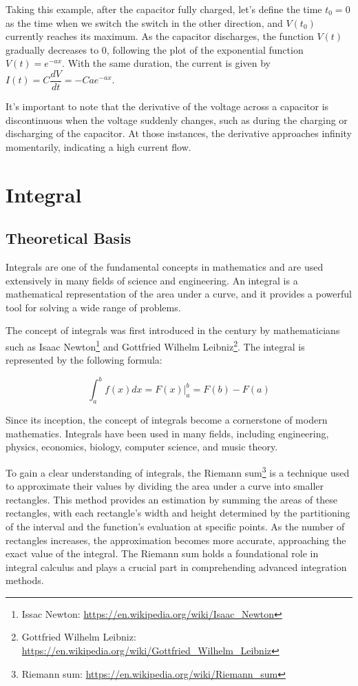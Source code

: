 \documentclass[13pt,a4paper]{report}
\begin{document}
Taking this example, after the capacitor fully charged, let's define the time $t_0=0$ as the time when we switch the switch in the other direction, and $V(t_0)$ currently reaches its maximum. As the capacitor discharges, the function $V(t)$ gradually decreases to 0, following the plot of the exponential function $V(t)=e^{-ax}$. With the same duration, the current is given by $I(t)=C\dfrac{dV}{dt}=-Cae^{-ax}$.

It's important to note that the derivative of the voltage across a capacitor is discontinuous when the voltage suddenly changes, such as during the charging or discharging of the capacitor. At those instances, the derivative approaches infinity momentarily, indicating a high current flow.








\newpage
\section{Integral}
\subsection{Theoretical Basis}
Integrals are one of the fundamental concepts in mathematics and are used extensively in many fields of science and engineering. An integral is a mathematical representation of the area under a curve, and it provides a powerful tool for solving a wide range of problems.

The concept of integrals was first introduced in the  century by mathematicians such as Isaac Newton\footnote{Issac Newton: \url{https://en.wikipedia.org/wiki/Isaac_Newton}} and Gottfried Wilhelm Leibniz\footnote{Gottfried Wilhelm Leibniz: \url{https://en.wikipedia.org/wiki/Gottfried_Wilhelm_Leibniz}}. The integral is represented by the following formula:

$$\int_a^b f(x)dx=F(x)\bigg|_a^b=F(b)-F(a)$$

Since its inception, the concept of integrals become a cornerstone of modern mathematics. Integrals have been used in many fields, including engineering, physics, economics, biology, computer science, and music theory.

To gain a clear understanding of integrals, the Riemann sum\footnote{Riemann sum: \url{https://en.wikipedia.org/wiki/Riemann_sum}} is a technique used to approximate their values by dividing the area under a curve into smaller rectangles. This method provides an estimation by summing the areas of these rectangles, with each rectangle's width and height determined by the partitioning of the interval and the function's evaluation at specific points. As the number of rectangles increases, the approximation becomes more accurate, approaching the exact value of the integral. The Riemann sum holds a foundational role in integral calculus and plays a crucial part in comprehending advanced integration methods.
\end{document}
